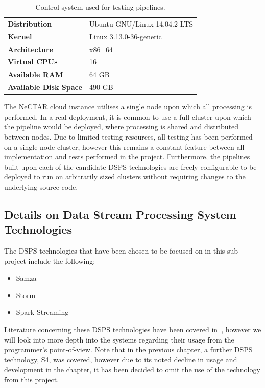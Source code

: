 \begin{table}[ht]
\caption{Control system used for testing pipelines.}
\label{tab:control}
\centering
\begin{tabular}{ll}
\textbf{Distribution}         & Ubuntu GNU/Linux 14.04.2 LTS \\
\textbf{Kernel}               & Linux 3.13.0-36-generic    \\
\textbf{Architecture}         & x86\_64                    \\
\textbf{Virtual CPUs}         & 16                         \\
\textbf{Available RAM}        & 64 GB                      \\
\textbf{Available Disk Space} & 490 GB
\end{tabular}
\end{table}

The NeCTAR cloud instance utilises a single node upon which all processing is performed. In a real deployment, it is
common to use a full cluster upon which the pipeline would be deployed, where processing is shared and distributed between nodes. Due to
limited testing resources, all testing
has been performed on a single node cluster, however this remains a constant feature between all implementation and tests
performed in the project. Furthermore, the pipelines built upon
each of the candidate DSPS technologies are freely configurable to be deployed to run on arbitrarily sized clusters without
requiring changes to the underlying source code.



\subsection{Details on Data Stream Processing System Technologies} %
\label{sub:setting_up_of_dsps_technologies}

The DSPS technologies that have been chosen to be focused on in this sub-project include the following:

\begin{itemize}
  \item Samza
  \item Storm
  \item Spark Streaming
\end{itemize}

Literature concerning these DSPS technologies have been covered in~, however
we will look into more depth into the systems regarding their usage from the programmer's point-of-view. Note that
in the previous chapter, a further DSPS technology, S4, was covered, however due to its noted decline in usage and
development in the chapter, it has been decided to omit the use of the technology from this project.

